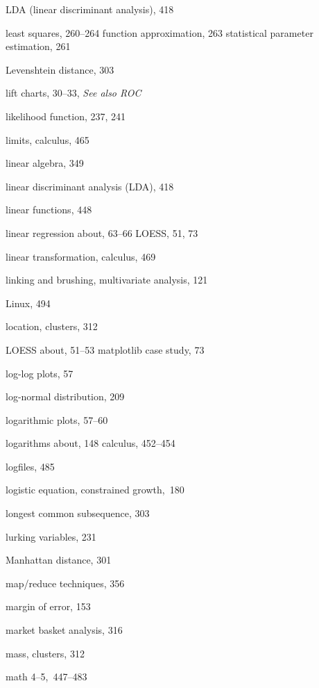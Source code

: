 \documentclass{Oreilly5980006}
\begin{document}
\begin{theindex}
  \item LDA (linear discriminant analysis), 418
  \item least squares, 260--264
    \subitem function approximation, 263
    \subitem statistical parameter estimation, 261
  \item Levenshtein distance, 303
  \item lift charts, 30--33, {\it See also ROC}
  \item likelihood function, 237, 241
  \item limits, calculus, 465
  \item linear algebra, 349
  \item linear discriminant analysis (LDA), 418
  \item linear functions, 448
  \item linear regression
    \subitem about, 63--66 \leaflong{2pt}
    \subitem LOESS, 51, 73
  \item linear transformation, calculus, 469
  \item linking and brushing, multivariate analysis, 121
  \item Linux, 494
  \item location, clusters, 312
  \item LOESS
    \subitem about, 51--53
    \subitem matplotlib case study, 73
  \item log-log plots, 57
  \item log-normal distribution, 209
  \item logarithmic plots, 57--60
  \item logarithms
    \subitem about, 148
    \subitem calculus, 452--454
  \item logfiles, 485
  \item logistic equation, constrained growth,~180
  \item longest common subsequence, 303
  \item lurking variables, 231

  \indexspace

  \item Manhattan distance, 301
  \item map/reduce techniques, 356
  \item margin of error, 153
  \item market basket analysis, 316
  \item mass, clusters, 312
 \item math 4--5,\,   447--483


\end{theindex}
\end{document}
